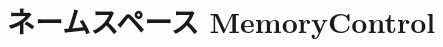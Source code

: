\hypertarget{namespaceMemoryControl}{
\section{ネームスペース MemoryControl}
\label{namespaceMemoryControl}
}
